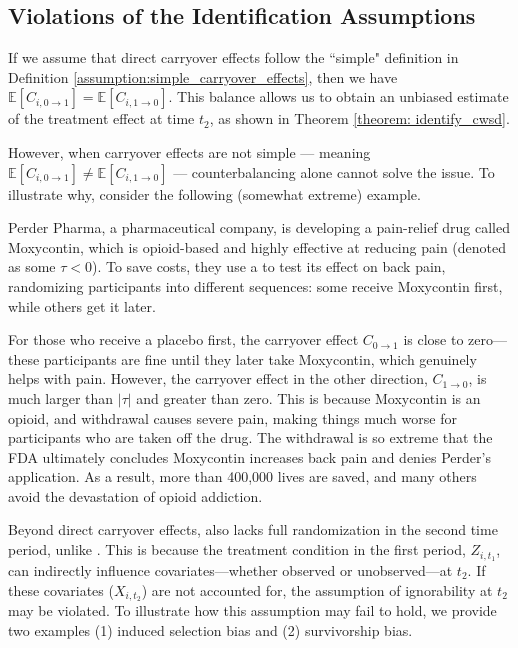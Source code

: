 \subsection{Violations of the Identification Assumptions} 

If we assume that direct carryover effects follow the ``simple" definition in Definition \ref{assumption:simple_carryover_effects}, then we have \(\mathbb{E}[C_{i,0 \to 1}] = \mathbb{E}[C_{i,1 \to 0}]\). This balance allows us to obtain an unbiased estimate of the treatment effect at time \( t_2 \), as shown in Theorem \ref{theorem: identify_cwsd}.  

However, when carryover effects are not simple — meaning \(\mathbb{E}[C_{i,0 \to 1}] \neq \mathbb{E}[C_{i,1 \to 0}]\) — counterbalancing alone cannot solve the issue. To illustrate why, consider the following (somewhat extreme) example.  

Perder Pharma, a pharmaceutical company, is developing a pain-relief drug called Moxycontin, which is opioid-based and highly effective at reducing pain (denoted as some \(\tau < 0\)). To save costs, they use a \cwsd{} to test its effect on back pain, randomizing participants into different sequences: some receive Moxycontin first, while others get it later.  

For those who receive a placebo first, the carryover effect \(C_{0 \to 1}\) is close to zero—these participants are fine until they later take Moxycontin, which genuinely helps with pain. However, the carryover effect in the other direction, \(C_{1 \to 0}\), is much larger than \(|\tau|\) and greater than zero. This is because Moxycontin is an opioid, and withdrawal causes severe pain, making things much worse for participants who are taken off the drug. The withdrawal is so extreme that the FDA ultimately concludes Moxycontin increases back pain and denies Perder's application. As a result, more than 400,000 lives are saved, and many others avoid the devastation of opioid addiction.  

Beyond direct carryover effects, \cwsd{} also lacks full randomization in the second time period, unlike \bsd{}. This is because the treatment condition in the first period, \(Z_{i,t_1}\), can indirectly influence covariates—whether observed or unobserved—at \(t_2\). If these covariates (\(X_{i,t_2}\)) are not accounted for, the assumption of ignorability at \(t_2\) may be violated. To illustrate how this assumption may fail to hold, we provide two examples (1) induced selection bias and (2) survivorship bias. 

